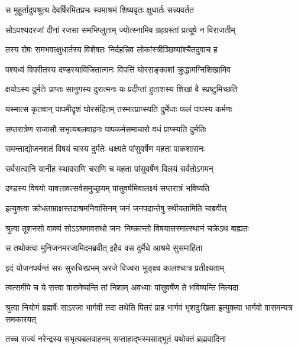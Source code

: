 
\twolineshloka
{स मुहूर्तादुपश्रुत्य देवर्षिरमितप्रभः}
{स्वमाश्रमं शिष्यवृतः क्षुधार्तः सन्न्यवर्तत} %

\twolineshloka
{सोऽपश्यदरजां दीनां रजसा समभिप्लुताम्}
{ज्योत्स्नामिव ग्रहग्रस्तां प्रत्यूषे न विराजतीम्} %

\twolineshloka
{तस्य रोषः समभवत्क्षुधार्तस्य विशेषतः}
{निर्दहन्निव लोकांस्त्रीञ्छिष्यांश्चैतदुवाच ह} %

\twolineshloka
{पश्यध्वं विपरीतस्य दण्डस्याविजितात्मनः}
{विपत्तिं घोरसङ्काशां क्रुद्धामग्निशिखामिव} %

\twolineshloka
{क्षयोऽस्य दुर्मतेः प्राप्तः सानुगस्य दुरात्मनः}
{यः प्रदीप्तां हुताशस्य शिखां वै स्प्रष्टुमिच्छति} %

\twolineshloka
{यस्मात्स कृतवान् पापमीदृशं घोरसंहितम्}
{तस्मात्प्राप्स्यति दुर्मेधाः फलं पापस्य कर्मणः} %

\twolineshloka
{सप्तरात्रेण राजासौ सभृत्यबलवाहनः}
{पापकर्मसमाचारो वधं प्राप्स्यति दुर्मतिः} %

\twolineshloka
{समन्ताद्योजनशतं विषयं चास्य दुर्मतेः}
{धक्ष्यते पांसुवर्षेण महता पाकशासनः} %

\twolineshloka
{सर्वसत्वानि यानीह स्थावराणि चराणि च}
{महता पांसुवर्षेण विलयं सर्वतोऽगमन्} %

\twolineshloka
{दण्डस्य विषयो यावत्तावत्सर्वसमुच्छ्रयम्}
{पांसुवर्षमिवालक्ष्यं सप्तरात्रं भविष्यति} %

\twolineshloka
{इत्युक्त्वा क्रोधताम्राक्षस्तदाश्रमनिवासिनम्}
{जनं जनपदान्तेषु स्थीयतामिति चाब्रवीत्} %

\twolineshloka
{श्रुत्वा तूशनसो वाक्यं सोऽऽश्रमावसथो जनः}
{निष्क्रान्तो विषयात्तस्मात्स्थानं चक्रेऽथ बाह्यतः} %

\twolineshloka
{स तथोक्त्वा मुनिजनमरजामिदमब्रवीत्}
{इहैव वस दुर्मेधे आश्रमे सुसमाहिता} %

\twolineshloka
{इदं योजनपर्यन्तं सरः सुरुचिरप्रभम्}
{अरजे विज्वरा भुङ्क्ष्व कालश्चात्र प्रतीक्ष्यताम्} %

\twolineshloka
{त्वत्समीपे च ये सत्त्वा वासमेष्यन्ति तां निशाम्}
{अवध्याः पांसुवर्षेण ते भविष्यन्ति नित्यदा} %

\threelineshloka
{श्रुत्वा नियोगं ब्रह्मर्षेः साऽरजा भार्गवी तदा}
{तथेति पितरं प्राह भार्गवं भृशदुःखिता}
{इत्युक्त्वा भार्गवो वासमन्यत्र समकारयत्} %

\twolineshloka
{तच्च राज्यं नरेन्द्रस्य सभृत्यबलवाहनम्}
{सप्ताहाद्भस्मसाद्भूतं यथोक्तं ब्रह्मवादिना} %

